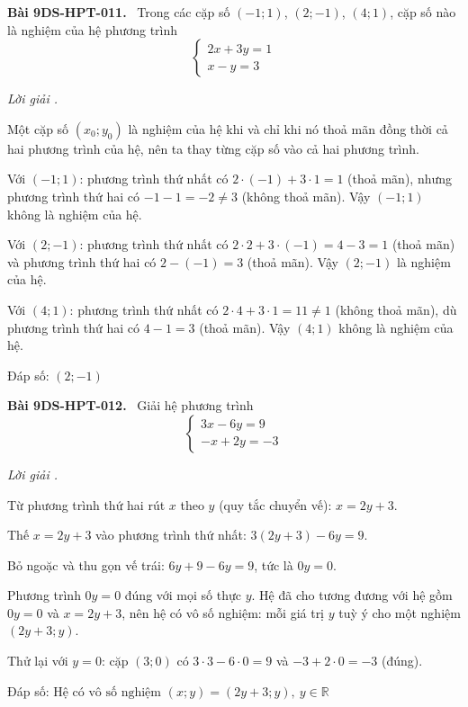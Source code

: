 \documentclass[12pt,a4paper]{article}
\newenvironment{problem}[1][]{\par\medskip\noindent\textbf{Bài #1.}\ }{\par}
\newenvironment{solution}[1][]{\par\noindent\textit{Lời giải #1.}\par}{\par}
\begin{document}
\begin{problem}[9DS-HPT-011]
Trong các cặp số $(-1; 1)$, $(2; -1)$, $(4; 1)$, cặp số nào là nghiệm của hệ phương trình
\[ \begin{cases} 2x + 3y = 1 \\ x - y = 3 \end{cases} \]

\begin{solution}
Một cặp số $(x_0; y_0)$ là nghiệm của hệ khi và chỉ khi nó thoả mãn đồng thời cả hai phương trình của hệ, nên ta thay từng cặp số vào cả hai phương trình.

Với $(-1; 1)$: phương trình thứ nhất có $2 \cdot (-1) + 3 \cdot 1 = 1$ (thoả mãn), nhưng phương trình thứ hai có $-1 - 1 = -2 \neq 3$ (không thoả mãn). Vậy $(-1; 1)$ không là nghiệm của hệ.

Với $(2; -1)$: phương trình thứ nhất có $2 \cdot 2 + 3 \cdot (-1) = 4 - 3 = 1$ (thoả mãn) và phương trình thứ hai có $2 - (-1) = 3$ (thoả mãn). Vậy $(2; -1)$ là nghiệm của hệ.

Với $(4; 1)$: phương trình thứ nhất có $2 \cdot 4 + 3 \cdot 1 = 11 \neq 1$ (không thoả mãn), dù phương trình thứ hai có $4 - 1 = 3$ (thoả mãn). Vậy $(4; 1)$ không là nghiệm của hệ.

Đáp số: $\boxed{(2; -1)}$
\end{solution}
\end{problem}

\begin{problem}[9DS-HPT-012]
Giải hệ phương trình
\[ \begin{cases} 3x - 6y = 9 \\ -x + 2y = -3 \end{cases} \]

\begin{solution}
Từ phương trình thứ hai rút $x$ theo $y$ (quy tắc chuyển vế): $x = 2y + 3$.

Thế $x = 2y + 3$ vào phương trình thứ nhất: $3(2y + 3) - 6y = 9$.

Bỏ ngoặc và thu gọn vế trái: $6y + 9 - 6y = 9$, tức là $0y = 0$.

Phương trình $0y = 0$ đúng với mọi số thực $y$. Hệ đã cho tương đương với hệ gồm $0y = 0$ và $x = 2y + 3$, nên hệ có vô số nghiệm: mỗi giá trị $y$ tuỳ ý cho một nghiệm $(2y + 3; y)$.

Thử lại với $y = 0$: cặp $(3; 0)$ có $3 \cdot 3 - 6 \cdot 0 = 9$ và $-3 + 2 \cdot 0 = -3$ (đúng).

Đáp số: $\boxed{\text{Hệ có vô số nghiệm } (x; y) = (2y + 3; y),\ y \in \mathbb{R}}$
\end{solution}
\end{problem}
\end{document}
